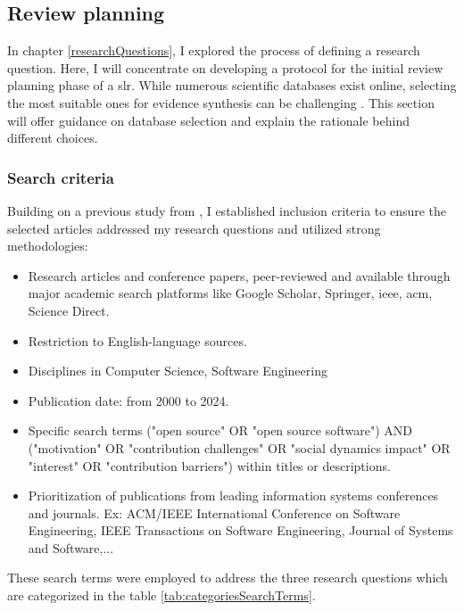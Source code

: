 \subsection{Review planning}

In chapter \ref{researchQuestions}, I explored the process of defining a research question. Here, I will concentrate on developing a protocol for the initial review planning phase of a \ac{slr}. While numerous scientific databases exist online, selecting the most suitable ones for evidence synthesis can be challenging \citep{academicSearchSystems}. This section will offer guidance on database selection and explain the rationale behind different choices.



\subsubsection{Search criteria}
Building on a previous study from \citet{Chua_Zhang_2020}, I established inclusion criteria to ensure the selected articles addressed my research questions and utilized strong methodologies:

\begin{itemize}
    \item Research articles and conference papers, peer-reviewed and available through major academic search platforms like Google Scholar, Springer, \ac{ieee}, \ac{acm}, Science Direct.
    \item Restriction to English-language sources.
    \item Disciplines in Computer Science, Software Engineering
    \item Publication date: from 2000 to 2024.
    \item Specific search terms ("open source" OR "open source software") AND ("motivation" OR "contribution challenges" OR "social dynamics impact" OR "interest" OR "contribution barriers") within titles or descriptions.
    \item Prioritization of publications from leading information systems conferences and journals. Ex: ACM/IEEE International Conference on Software Engineering, IEEE Transactions on Software Engineering, Journal of Systems and Software,...
\end{itemize}

These search terms were employed to address the three research questions which are categorized in the table \ref{tab:categoriesSearchTerms}.

